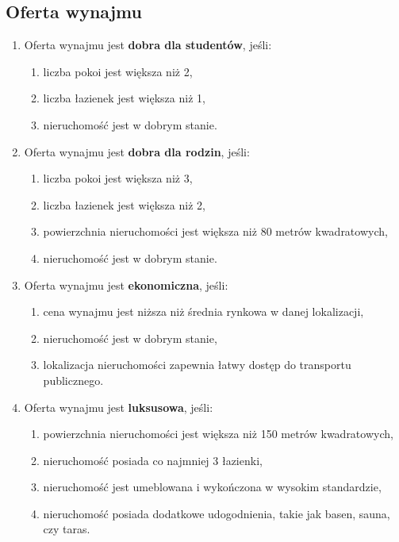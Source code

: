 \subsection{Oferta wynajmu}
\begin{enumerate}[label=W\arabic*.]
    \item Oferta wynajmu jest \textbf{dobra dla studentów}, jeśli:
    \begin{enumerate}[label=\arabic*.]
        \item liczba pokoi jest większa niż 2,
        \item liczba łazienek jest większa niż 1,
        \item nieruchomość jest w dobrym stanie.
    \end{enumerate}
    \item Oferta wynajmu jest \textbf{dobra dla rodzin}, jeśli:
    \begin{enumerate}[label=\arabic*.]
        \item liczba pokoi jest większa niż 3,
        \item liczba łazienek jest większa niż 2,
        \item powierzchnia nieruchomości jest większa niż 80 metrów kwadratowych,
        \item nieruchomość jest w dobrym stanie.
    \end{enumerate}
    \item Oferta wynajmu jest \textbf{ekonomiczna}, jeśli:
    \begin{enumerate}[label=\arabic*.]
        \item cena wynajmu jest niższa niż średnia rynkowa w danej lokalizacji,
        \item nieruchomość jest w dobrym stanie,
        \item lokalizacja nieruchomości zapewnia łatwy dostęp do transportu publicznego.
    \end{enumerate}
    \item Oferta wynajmu jest \textbf{luksusowa}, jeśli:
    \begin{enumerate}[label=\arabic*.]
        \item powierzchnia nieruchomości jest większa niż 150 metrów kwadratowych,
        \item nieruchomość posiada co najmniej 3 łazienki,
        \item nieruchomość jest umeblowana i wykończona w wysokim standardzie,
        \item nieruchomość posiada dodatkowe udogodnienia, takie jak basen, sauna, czy taras.

\end{enumerate}
\end{enumerate}
